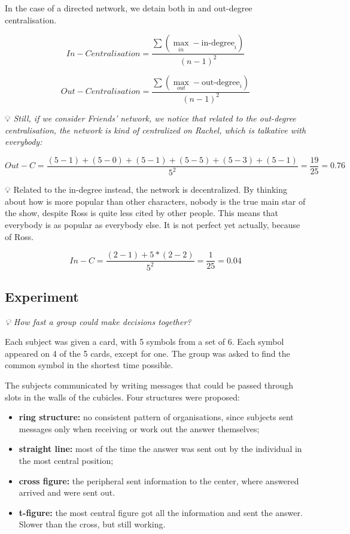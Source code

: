 \documentclass[
  notitlepage,
  onecolumn,
  openany]{book}
\providecommand{\tightlist}{%
  \setlength{\itemsep}{0pt}\setlength{\parskip}{0pt}}
\begin{document}
In the case of a directed network, we detain both in and out-degree centralisation.

\[
In-Centralisation = \frac{\sum (\max_{in}-\text{in-degree}_i)}{(n-1)^2}
\]

\[
Out-Centralisation = \frac{\sum (\max_{out}-\text{out-degree}_i)}{(n-1)^2}
\]

💡 \emph{Still, if we consider Friends' network, we notice that related to the out-degree centralisation, the network is kind of centralized on Rachel, which is talkative with everybody:}

\[
Out-C = \frac{(5-1)+(5-0)+(5-1)+(5-5)+(5-3)+(5-1)}{5^2} = \frac{19}{25} = 0.76
\]

💡 Related to the in-degree instead, the network is decentralized. By thinking about how is more popular than other characters, nobody is the true main star of the show, despite Ross is quite less cited by other people. This means that everybody is as popular as everybody else. It is not perfect yet actually, because of Ross.

\[
In-C = \frac{(2-1)+5*(2-2)}{5^2} = \frac{1}{25} = 0.04
\]

\hypertarget{experiment}{%
\subsection{Experiment}\label{experiment}}

\emph{💡 How fast a group could make decisions together?}

Each subject was given a card, with 5 symbols from a set of 6. Each symbol appeared on 4 of the 5 cards, except for one. The group was asked to find the common symbol in the shortest time possible.

The subjects communicated by writing messages that could be passed through slots in the walls of the cubicles. Four structures were proposed:

\begin{itemize}
\tightlist
\item
  \textbf{ring structure:} no consistent pattern of organisations, since subjects sent messages only when receiving or work out the answer themselves;
\item
  \textbf{straight line:} most of the time the answer was sent out by the individual in the most central position;
\item
  \textbf{cross figure:} the peripheral sent information to the center, where answered arrived and were sent out.
\item
  \textbf{t-figure:} the most central figure got all the information and sent the answer. Slower than the cross, but still working.
\end{itemize}
\end{document}
